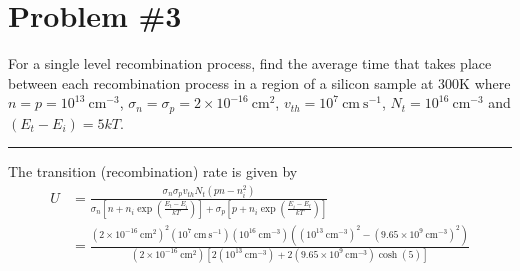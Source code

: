 \documentclass{article}
\newcommand{\horline}
           {\begin{center}
              \noindent\rule{8cm}{0.4pt}
            \end{center}}
\begin{document}
%
%

\pagebreak

\section*{Problem \#3}
For a single level recombination process, find the average time that takes 
place between each recombination process in a region of a silicon
sample at 300K where $n = p = 10^{13} ~\mathrm{cm}^{-3}$,
$\sigma_n = \sigma_p = 2 \times 10^{-16} ~\mathrm{cm}^2$, 
$v_{th} = 10^{7} ~\mathrm{cm} ~\mathrm{s}^{-1}$, 
$N_t = 10^{16} ~\mathrm{cm}^{-3}$ and $(E_t - E_i) = 5 kT$.
\horline
The transition (recombination) rate is given by
\begin{align*}
  U &= \frac{\sigma_n \sigma_p v_{th} N_t(pn - n_i^2)}
           {\sigma_n \left[n + n_i \exp\left(\frac{E_t - E_i}{kT}\right)\right]
          + \sigma_p \left[p + n_i \exp\left(\frac{E_i - E_t}{kT}\right)\right]} \\
    &= \frac{(2 \times 10^{-16} ~\mathrm{cm}^2)^2 
             (10^7 ~\mathrm{cm}~\mathrm{s}^{-1})
             (10^{16} ~\mathrm{cm}^{-3})
             ((10^{13} ~\mathrm{cm}^{-3})^2 - (9.65 \times 10^9 ~\mathrm{cm}^{-3})^2)}
            {(2 \times 10^{-16} ~\mathrm{cm}^2)
             \left[2(10^{13} ~\mathrm{cm}^{-3}) 
           + 2(9.65 \times 10^9 ~\mathrm{cm}^{-3})\cosh(5)\right]}
\end{align*}
\end{document}
